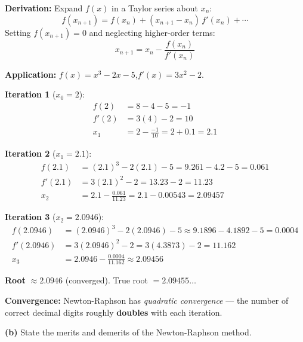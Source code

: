 \documentclass[12pt]{article}
\begin{document}
\begin{ansbox}
\textbf{Derivation:} Expand $f(x)$ in a Taylor series about $x_n$:
\[
  f(x_{n+1}) = f(x_n) + (x_{n+1}-x_n)\,f'(x_n) + \cdots
\]
Setting $f(x_{n+1}) = 0$ and neglecting higher-order terms:
\[
  \boxed{x_{n+1} = x_n - \frac{f(x_n)}{f'(x_n)}}
\]

\medskip
\textbf{Application:} $f(x) = x^3 - 2x - 5$,\quad $f'(x) = 3x^2 - 2$.

\medskip\textbf{Iteration 1} ($x_0 = 2$):
\begin{align*}
  f(2) &= 8 - 4 - 5 = -1\\
  f'(2) &= 3(4) - 2 = 10\\
  x_1 &= 2 - \frac{-1}{10} = 2 + 0.1 = \mathbf{2.1}
\end{align*}

\textbf{Iteration 2} ($x_1 = 2.1$):
\begin{align*}
  f(2.1) &= (2.1)^3 - 2(2.1) - 5 = 9.261 - 4.2 - 5 = 0.061\\
  f'(2.1) &= 3(2.1)^2 - 2 = 13.23 - 2 = 11.23\\
  x_2 &= 2.1 - \frac{0.061}{11.23} = 2.1 - 0.00543 = \mathbf{2.09457}
\end{align*}

\textbf{Iteration 3} ($x_2 = 2.0946$):
\begin{align*}
  f(2.0946) &= (2.0946)^3 - 2(2.0946) - 5 \approx 9.1896 - 4.1892 - 5 = 0.0004\\
  f'(2.0946) &= 3(2.0946)^2 - 2 = 3(4.3873) - 2 = 11.162\\
  x_3 &= 2.0946 - \frac{0.0004}{11.162} \approx \mathbf{2.09456}
\end{align*}

\textbf{Root} $\approx \boxed{2.0946}$ (converged). True root $= 2.09455\ldots$\;\checkmark

\medskip
\textbf{Convergence:} Newton-Raphson has \textit{quadratic convergence} — the number of correct decimal digits roughly \textbf{doubles} with each iteration.
\end{ansbox}

\medskip
\textbf{(b)} State the merits and demerits of the Newton-Raphson method.
\end{document}
